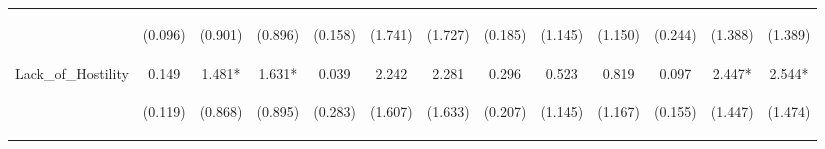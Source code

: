 \begin{tabular}{lcccccccccccc}
 & \begin{footnotesize}(0.096)\end{footnotesize} & \begin{footnotesize}(0.901)\end{footnotesize} & \begin{footnotesize}(0.896)\end{footnotesize} & \begin{footnotesize}(0.158)\end{footnotesize} & \begin{footnotesize}(1.741)\end{footnotesize} & \begin{footnotesize}(1.727)\end{footnotesize} & \begin{footnotesize}(0.185)\end{footnotesize} & \begin{footnotesize}(1.145)\end{footnotesize} & \begin{footnotesize}(1.150)\end{footnotesize} & \begin{footnotesize}(0.244)\end{footnotesize} & \begin{footnotesize}(1.388)\end{footnotesize} & \begin{footnotesize}(1.389)\end{footnotesize}\\
\noalign{\smallskip}Lack_of_Hostility & 0.149 & 1.481* & 1.631* & 0.039 & 2.242 & 2.281 & 0.296 & 0.523 & 0.819 & 0.097 & 2.447* & 2.544*\\
 & \begin{footnotesize}(0.119)\end{footnotesize} & \begin{footnotesize}(0.868)\end{footnotesize} & \begin{footnotesize}(0.895)\end{footnotesize} & \begin{footnotesize}(0.283)\end{footnotesize} & \begin{footnotesize}(1.607)\end{footnotesize} & \begin{footnotesize}(1.633)\end{footnotesize} & \begin{footnotesize}(0.207)\end{footnotesize} & \begin{footnotesize}(1.145)\end{footnotesize} & \begin{footnotesize}(1.167)\end{footnotesize} & \begin{footnotesize}(0.155)\end{footnotesize} & \begin{footnotesize}(1.447)\end{footnotesize} & \begin{footnotesize}(1.474)\end{footnotesize}\\

\end{tabular}
